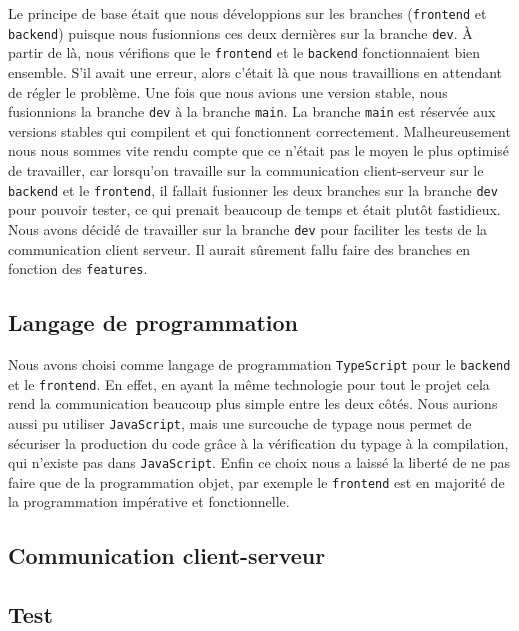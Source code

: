 Le principe de base était que nous développions sur les branches (\lstinline{frontend} et \lstinline{backend}) puisque nous fusionnions ces deux dernières sur la branche \lstinline{dev}.
À partir de là, nous vérifions que le {\tt frontend} et le {\tt backend} fonctionnaient bien ensemble.
S'il avait une erreur, alors c'était là que nous travaillions en attendant de régler le problème.
Une fois que nous avions une version stable, nous fusionnions la branche \lstinline{dev} à la branche \lstinline{main}.
La branche {\tt main} est réservée aux versions stables qui compilent et qui fonctionnent correctement.
Malheureusement nous nous sommes vite rendu compte que ce n'était pas le moyen le plus optimisé de travailler, car lorsqu'on travaille sur la communication client-serveur sur le \lstinline{backend} et le \lstinline{frontend}, il fallait fusionner les deux branches sur la branche \lstinline{dev} pour pouvoir tester, ce qui prenait beaucoup de temps et était plutôt fastidieux.
Nous avons décidé de travailler sur la branche \lstinline{dev} pour faciliter les tests de la communication client serveur.
Il aurait sûrement fallu faire des branches en fonction des {\tt features}.

\subsection{Langage de programmation}

Nous avons choisi comme langage de programmation \lstinline{TypeScript} pour le \lstinline{backend} et le \lstinline{frontend}. En effet, en ayant la même technologie pour tout le projet cela rend la communication beaucoup plus simple entre les deux côtés.
Nous aurions aussi pu utiliser \lstinline{JavaScript}, mais une surcouche de typage nous permet de sécuriser la production du code grâce à la vérification du typage à la compilation, qui n'existe pas dans \lstinline{JavaScript}.
Enfin ce choix nous a laissé la liberté de ne pas faire que de la programmation objet, par exemple le \lstinline{frontend} est en majorité de la programmation impérative et fonctionnelle.

\subsection{Communication client-serveur}



\subsection{Test}

